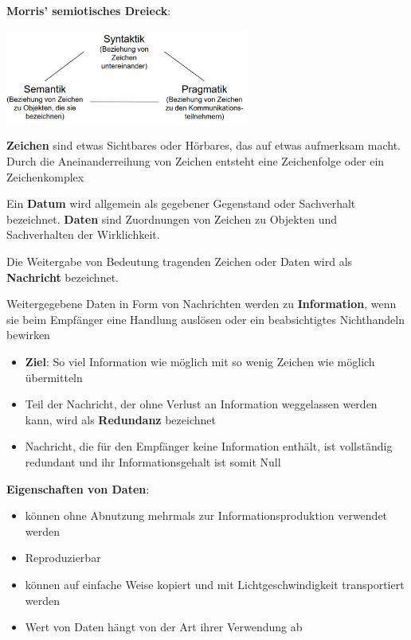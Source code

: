 \textbf{Morris’ semiotisches Dreieck}:
\begin{center}
	\includegraphics[width=0.6\textwidth]{images/semiotisches Dreieck.png}
\end{center}

\textbf{Zeichen} sind etwas Sichtbares oder Hörbares, das auf etwas aufmerksam macht. Durch die Aneinanderreihung von Zeichen entsteht eine Zeichenfolge oder ein Zeichenkomplex

Ein \textbf{Datum} wird allgemein als gegebener Gegenstand oder Sachverhalt bezeichnet. \textbf{Daten} sind Zuordnungen von Zeichen zu Objekten und Sachverhalten der Wirklichkeit.

Die Weitergabe von Bedeutung tragenden Zeichen oder Daten wird als \textbf{Nachricht} bezeichnet.

Weitergegebene Daten in Form von Nachrichten werden zu \textbf{Information}, wenn sie beim Empfänger eine Handlung auslösen oder ein beabsichtigtes Nichthandeln bewirken
\begin{itemize}
	\item \textbf{Ziel}: So viel Information wie möglich mit so wenig Zeichen wie möglich übermitteln
	\item Teil der Nachricht, der ohne Verlust an Information weggelassen werden kann, wird als \textbf{Redundanz} bezeichnet
	\item Nachricht, die für den Empfänger keine Information enthält, ist vollständig redundant und ihr Informationsgehalt ist somit Null
\end{itemize}

\textbf{Eigenschaften von Daten}:
\begin{itemize}
	\item können ohne Abnutzung mehrmals zur Informationsproduktion verwendet werden
	\item Reproduzierbar
	\item können auf einfache Weise kopiert und mit Lichtgeschwindigkeit transportiert werden
	\item Wert von Daten hängt von der Art ihrer Verwendung ab
\end{itemize}
\pagebreak


